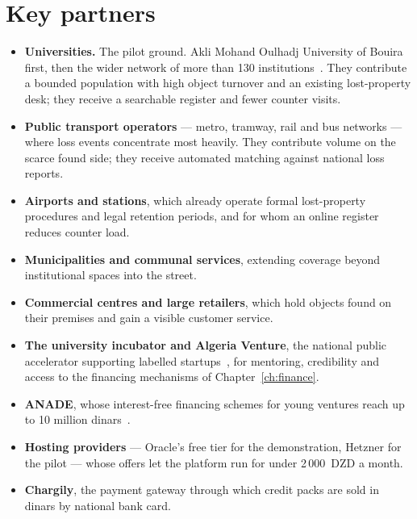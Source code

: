 \section{Key partners}

\begin{itemize}[leftmargin=1.4em,itemsep=5pt]
  \item \textbf{Universities.} The pilot ground. Akli Mohand Oulhadj University
        of Bouira first, then the wider network of more than 130
        institutions~\cite{mesrs2025}. They contribute a bounded population with
        high object turnover and an existing lost-property desk; they receive a
        searchable register and fewer counter visits.

  \item \textbf{Public transport operators} --- metro, tramway, rail and bus
        networks --- where loss events concentrate most heavily. They contribute
        volume on the scarce found side; they receive automated matching against
        national loss reports.

  \item \textbf{Airports and stations}, which already operate formal
        lost-property procedures and legal retention periods, and for whom an
        online register reduces counter load.

  \item \textbf{Municipalities and communal services}, extending coverage beyond
        institutional spaces into the street.

  \item \textbf{Commercial centres and large retailers}, which hold objects
        found on their premises and gain a visible customer service.

  \item \textbf{The university incubator and Algeria Venture}, the national
        public accelerator supporting labelled startups~\cite{startupdz}, for
        mentoring, credibility and access to the financing mechanisms of
        Chapter~\ref{ch:finance}.

  \item \textbf{ANADE}, whose interest-free financing schemes for young ventures
        reach up to 10 million dinars~\cite{anade2025}.

  \item \textbf{Hosting providers} --- Oracle's free tier for the
        demonstration, Hetzner for the pilot --- whose offers let the platform
        run for under 2\,000~DZD a month.

  \item \textbf{Chargily}, the payment gateway through which credit packs are
        sold in dinars by national bank card.
\end{itemize}
